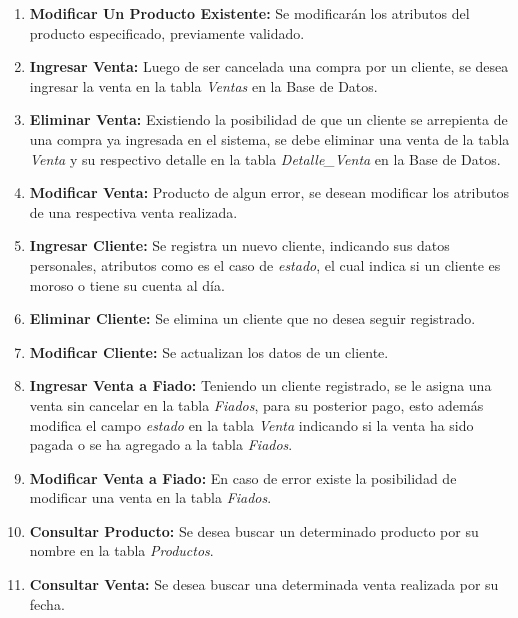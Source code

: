\documentclass[a4paper,12pt]{article}
\begin{document}
\begin{itemize}
\begin{enumerate}
       \item \textbf{Modificar Un Producto Existente: }Se modificarán los atributos del producto especificado, previamente validado.

       \item \textbf{Ingresar Venta: }Luego de ser cancelada una compra por un cliente, se desea ingresar la venta en la tabla \emph{Ventas}
				      en la Base de Datos.
       \item \textbf{Eliminar Venta: }Existiendo la posibilidad de que un cliente se arrepienta de una compra ya ingresada en el sistema,
                                      se debe eliminar una venta de la tabla \emph{Venta} y su respectivo detalle en la tabla \emph{Detalle\_Venta}
                                      en la Base de Datos.
       \item \textbf{Modificar Venta: }Producto de algun error, se desean modificar los atributos de una respectiva venta realizada.

       \item \textbf{Ingresar Cliente: }Se registra un nuevo cliente, indicando sus datos personales, atributos como es el caso de
					\emph{estado}, el cual indica si un cliente es moroso o tiene su cuenta al día.

       \item \textbf{Eliminar Cliente: }Se elimina un cliente que no desea seguir registrado.

       \item \textbf{Modificar Cliente: }Se actualizan los datos de un cliente.

       \item \textbf{Ingresar Venta a Fiado: }Teniendo un cliente registrado, se le asigna una venta sin cancelar en la tabla
					      \emph{Fiados}, para su posterior pago, esto además modifica el campo \emph{estado} en la tabla
					      \emph{Venta} indicando si la venta ha sido pagada o se ha agregado a la tabla \emph{Fiados}.

       \item \textbf{Modificar Venta a Fiado: }En caso de error existe la posibilidad de modificar una venta en la tabla \emph{Fiados}.

       \item \textbf{Consultar Producto: }Se desea buscar un determinado producto por su nombre en la tabla \emph{Productos}.

       \item \textbf{Consultar Venta: }Se desea buscar una determinada venta realizada por su fecha.


\end{enumerate}
\end{itemize}
\end{document}
